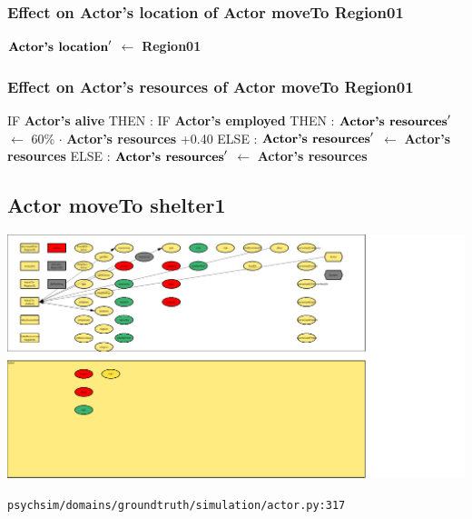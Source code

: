 \documentclass{article}%
\begin{document}
%
\subsubsection{Effect on Actor's location of Actor moveTo Region01}%
\label{ssubsec:Effect on Actor's location of Actor moveTo Region01}%
\begin{flushleft}%
$\mbox{\textbf{Actor's location}} '$%
$\leftarrow$%
\textbf{Region01}%
\end{flushleft}

%
\subsubsection{Effect on Actor's resources of Actor moveTo Region01}%
\label{ssubsec:Effect on Actor's resources of Actor moveTo Region01}%
\begin{flushleft}%
IF %
\textbf{Actor's alive}%
\linebreak%
\hspace*{2em}%
THEN %
: %
IF %
\textbf{Actor's employed}%
\linebreak%
\hspace*{4em}%
THEN %
: %
$\mbox{\textbf{Actor's resources}} '$%
$\leftarrow$%
60\%%
$\cdot$%
\textbf{Actor's resources}%
+0.40%
\linebreak%
\hspace*{4em}%
ELSE %
: %
$\mbox{\textbf{Actor's resources}} '$%
$\leftarrow$%
\textbf{Actor's resources}%
\linebreak%
\hspace*{2em}%
ELSE %
: %
$\mbox{\textbf{Actor's resources}} '$%
$\leftarrow$%
\textbf{Actor's resources}%
\end{flushleft}

%
\subsection{Actor moveTo shelter1}%
\label{subsec:Actor moveTo shelter1}%
\includegraphics[width=\textwidth]{images/Actor-moveTo-shelter1.png}%
\begin{flushleft}%
\verb|psychsim/domains/groundtruth/simulation/actor.py:317|%
\end{flushleft}%
\end{document}
